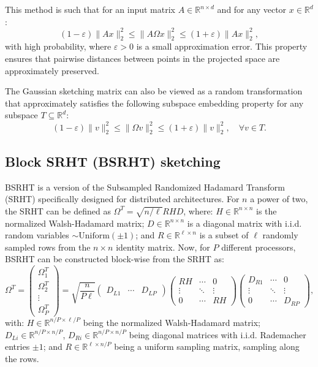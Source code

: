 \documentclass[a4paper, 12pt,oneside]{article}
\begin{document}
	This method is such that for an input matrix $A \in \mathbb{R}^{n \times d}$ and for any vector $x \in \mathbb{R}^d$:
	\[
	(1 - \varepsilon)\|A x\|_2^2 \leq \|A \Omega x\|_2^2 \leq (1 + \varepsilon)\|A x\|_2^2,
	\]
	with high probability, where $\varepsilon > 0$ is a small approximation error. This property ensures that pairwise distances between points in the projected space are approximately preserved.

	The Gaussian sketching matrix can also be viewed as a random transformation that approximately satisfies the following subspace embedding property for any subspace $T \subseteq \mathbb{R}^d$:
	\[
	(1 - \varepsilon) \|v\|_2^2 \leq \|\Omega v\|_2^2 \leq (1 + \varepsilon) \|v\|_2^2, \quad \forall v \in T.
	\]
	\subsection{Block SRHT (BSRHT) sketching}
	BSRHT is a version of the Subsampled Randomized Hadamard Transform (SRHT) specifically designed for distributed architectures. For $n$ a power of two, the SRHT can be defined as $\Omega^T = \sqrt{n/ \ell} RHD$, where: $H \in \mathbb{R}^{n \times n}$ is the normalized Walsh-Hadamard matrix; $D \in \mathbb{R}^{n \times n}$ is a diagonal matrix with i.i.d. random variables $\sim \text{Uniform}(\pm 1)$; and $R \in \mathbb{R}^{\ell \times n}$ is a subset of $\ell$ randomly sampled rows from the $n \times n$ identity matrix. Now, for $P$ different processors, BSRHT can be constructed block-wise from the SRHT as:
	\[
	\Omega^T = \begin{pmatrix} \Omega_1^T \\
	\Omega_2^T \\
	\vdots \\
	\Omega_P^T \end{pmatrix} = \sqrt{\frac{n}{P\ell}} \begin{pmatrix} D_{L1} & \cdots & D_{LP} \end{pmatrix}
	\begin{pmatrix}
	RH & \cdots & 0 \\
	\vdots & \ddots & \vdots \\
	0 & \cdots & RH
	\end{pmatrix}
	\begin{pmatrix} D_{R1} & \cdots & 0 \\
	\vdots & \ddots & \vdots \\
	0 & \cdots & D_{RP} \end{pmatrix}, \tag{2}
	\]
	with: $H \in \mathbb{R}^{n/P \times \ell/P}$ being the normalized Walsh-Hadamard matrix; $D_{Li} \in \mathbb{R}^{n/P \times n/P}$, $D_{Ri} \in \mathbb{R}^{n/P \times n/P}$ being diagonal matrices with i.i.d. Rademacher entries $\pm 1$; and $R \in \mathbb{R}^{\ell \times n/P}$ being a uniform sampling matrix, sampling along the rows.
\end{document}
